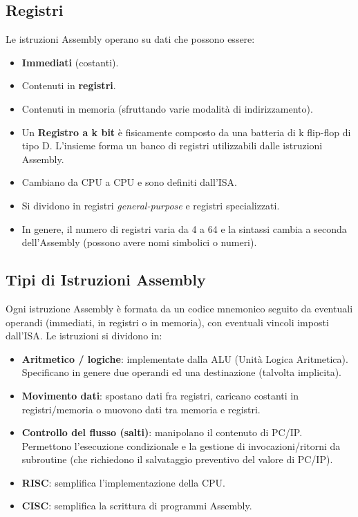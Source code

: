 \documentclass[12pt, a4paper]{article}
\begin{document}
\subsection{Registri}
Le istruzioni Assembly operano su dati che possono essere:
\begin{itemize}
    \item \textbf{Immediati} (costanti).
    \item Contenuti in \textbf{registri}.
    \item Contenuti in memoria (sfruttando varie modalità di indirizzamento).
\end{itemize}
\begin{itemize}
    \item Un \textbf{Registro a k bit} è fisicamente composto da una batteria di k flip-flop di tipo D. L'insieme forma un banco di registri utilizzabili dalle istruzioni Assembly.
    \item Cambiano da CPU a CPU e sono definiti dall'ISA.
    \item Si dividono in registri \textit{general-purpose} e registri specializzati.
    \item In genere, il numero di registri varia da 4 a 64 e la sintassi cambia a seconda dell'Assembly (possono avere nomi simbolici o numeri).
\end{itemize}

\subsection{Tipi di Istruzioni Assembly}
Ogni istruzione Assembly è formata da un codice mnemonico seguito da eventuali operandi (immediati, in registri o in memoria), con eventuali vincoli imposti dall'ISA. Le istruzioni si dividono in:
\begin{itemize}
    \item \textbf{Aritmetico / logiche}: implementate dalla ALU (Unità Logica Aritmetica). Specificano in genere due operandi ed una destinazione (talvolta implicita).
    \item \textbf{Movimento dati}: spostano dati fra registri, caricano costanti in registri/memoria o muovono dati tra memoria e registri.
    \item \textbf{Controllo del flusso (salti)}: manipolano il contenuto di PC/IP. Permettono l'esecuzione condizionale e la gestione di invocazioni/ritorni da subroutine (che richiedono il salvataggio preventivo del valore di PC/IP).
\end{itemize}
\begin{itemize}
    \item \textbf{RISC}: semplifica l'implementazione della CPU.
    \item \textbf{CISC}: semplifica la scrittura di programmi Assembly.
\end{itemize}
\end{document}
